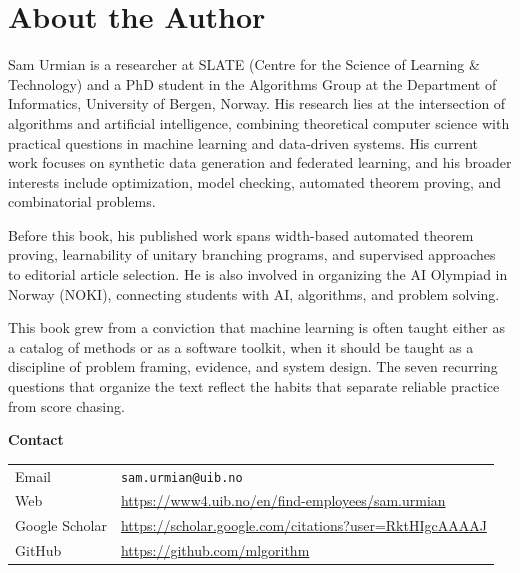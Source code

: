 \chapter*{About the Author}

Sam Urmian is a researcher at SLATE (Centre for the Science of Learning \& Technology) and a PhD student in the Algorithms Group at the Department of Informatics, University of Bergen, Norway. His research lies at the intersection of algorithms and artificial intelligence, combining theoretical computer science with practical questions in machine learning and data-driven systems. His current work focuses on synthetic data generation and federated learning, and his broader interests include optimization, model checking, automated theorem proving, and combinatorial problems.

Before this book, his published work spans width-based automated theorem proving, learnability of unitary branching programs, and supervised approaches to editorial article selection. He is also involved in organizing the AI Olympiad in Norway (NOKI), connecting students with AI, algorithms, and problem solving.

This book grew from a conviction that machine learning is often taught either as a catalog of methods or as a software toolkit, when it should be taught as a discipline of problem framing, evidence, and system design. The seven recurring questions that organize the text reflect the habits that separate reliable practice from score chasing.

\bigskip
\noindent\textbf{Contact}

\medskip
\noindent
\begin{tabular}{@{}ll@{}}
Email & \texttt{sam.urmian@uib.no} \\
Web & \url{https://www4.uib.no/en/find-employees/sam.urmian} \\
Google Scholar & \url{https://scholar.google.com/citations?user=RktHIgcAAAAJ} \\
GitHub & \url{https://github.com/mlgorithm} \\
\end{tabular}
